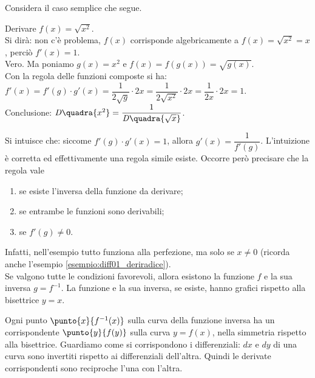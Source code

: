 Considera il caso semplice che segue.
\begin{esempio}
  Derivare $f(x)=\sqrt{x^2}$.\\
  Si dirà: non c'è problema, $f(x)$ corrisponde algebricamente a 
  $f(x)=\sqrt{x^2}=x$, perciò  $f'(x)=1$.\\
  Vero. Ma poniamo $g(x)=x^2$ e $f(x)=f(g(x))=\sqrt{g(x)}$.\\
  Con la regola delle funzioni composte si ha:\\ 
  $f'(x)=f'(g)\cdot g'(x)= \dfrac{1}{2\sqrt{g}}\cdot 2x=
  \dfrac{1}{2\sqrt{x^2}}\cdot 2x=\dfrac{1}{2x}\cdot 2x=1$.\\
  Conclusione: 
$\mathit{D}\quadra{x^2}=\dfrac{1}{\mathit{D}\quadra{\sqrt{x}}}$.
\end{esempio}
Si intuisce che: siccome $f'(g)\cdot g'(x)=1$, allora $g'(x)=\dfrac{1}{f'(g)}$.
L'intuizione è corretta ed effettivamente una regola simile esiste. Occorre 
però precisare che la regola vale
 \begin{enumerate} [noitemsep]
  \item se esiste l'inversa della funzione da derivare;
  \item se entrambe le funzioni sono derivabili;
  \item se  $f'(g)\ne 0$.
 \end{enumerate}
Infatti, nell'esempio tutto funziona alla perfezione, ma solo se $x\ne 0$
(ricorda anche l'esempio \ref{esempio:diff01_deriradice}). \\
Se valgono tutte le condizioni favorevoli, allora esistono la funzione
$f$ e la sua inversa $g=f^{-1}$. La funzione e la sua inversa, se esiste,
hanno grafici rispetto alla bisettrice $y=x$.


\begin{inaccessibleblock}
 \begin{center}
 \begin{minipage}[]{.55\textwidth}
  \diffinversa
 \end{minipage} 
  \hfill
 \begin{minipage}[]{.42\textwidth}
Ogni punto $\punto{x}{f^{-1}(x)}$ sulla curva della funzione inversa ha un
corrispondente $\punto{y}{f(y)}$ sulla curva $y=f(x)$, nella simmetria 
rispetto alla bisettrice. Guardiamo come si corrispondono i differenziali:
$dx$ e $dy$ di una curva sono invertiti rispetto ai differenziali dell'altra.
Quindi le derivate corrispondenti sono reciproche l'una con l'altra.
 \end{minipage}
 \end{center}
\end{inaccessibleblock}
\label{}

